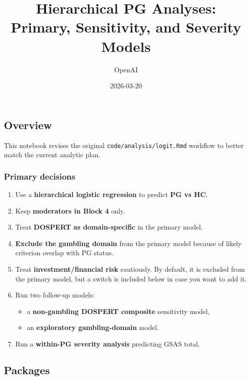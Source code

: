 \documentclass[
]{article}
\title{Hierarchical PG Analyses: Primary, Sensitivity, and Severity
Models}
\author{OpenAI}
\date{2026-03-20}
\providecommand{\tightlist}{%
  \setlength{\itemsep}{0pt}\setlength{\parskip}{0pt}}
\begin{document}
\maketitle

{
\setcounter{tocdepth}{3}
\tableofcontents
}
\subsection{Overview}\label{overview}

This notebook revises the original \texttt{code/analysis/logit.Rmd}
workflow to better match the current analytic plan.

\subsubsection{Primary decisions}\label{primary-decisions}

\begin{enumerate}
\def\labelenumi{\arabic{enumi}.}
\tightlist
\item
  Use a \textbf{hierarchical logistic regression} to predict \textbf{PG
  vs HC}.
\item
  Keep \textbf{moderators in Block 4} only.
\item
  Treat \textbf{DOSPERT as domain-specific} in the primary model.
\item
  \textbf{Exclude the gambling domain} from the primary model because of
  likely criterion overlap with PG status.
\item
  Treat \textbf{investment/financial risk} cautiously. By default, it is
  excluded from the primary model, but a switch is included below in
  case you want to add it.
\item
  Run two follow-up models:

  \begin{itemize}
  \tightlist
  \item
    a \textbf{non-gambling DOSPERT composite} sensitivity model,
  \item
    an \textbf{exploratory gambling-domain} model.
  \end{itemize}
\item
  Run a \textbf{within-PG severity analysis} predicting GSAS total.
\end{enumerate}

\subsection{Packages}\label{packages}
\end{document}
